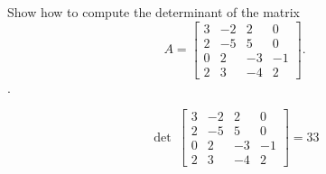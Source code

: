 
\begin{exerciseStatement}


Show how to compute the determinant of the matrix \[A= \left[\begin{array}{cccc}
3 & -2 & 2 & 0 \\
2 & -5 & 5 & 0 \\
0 & 2 & -3 & -1 \\
2 & 3 & -4 & 2
\end{array}\right] .\].


\end{exerciseStatement}
    
\begin{exerciseAnswer} 
\[\operatorname{det}\  \left[\begin{array}{cccc}
3 & -2 & 2 & 0 \\
2 & -5 & 5 & 0 \\
0 & 2 & -3 & -1 \\
2 & 3 & -4 & 2
\end{array}\right] = 33 \]
\end{exerciseAnswer}
    
